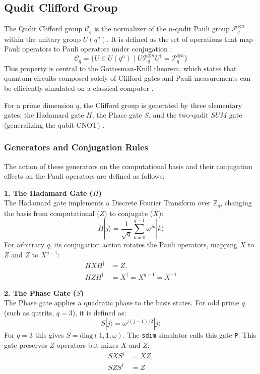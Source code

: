\subsection{Qudit Clifford Group}

The Qudit Clifford group $\mathcal{C}_q$ is the normalizer of the $n$-qudit Pauli group $\mathcal{P}_q^{\otimes n}$ within the unitary group $U(q^n)$. It is defined as the set of operations that map Pauli operators to Pauli operators under conjugation \cite{Gottesman1999}:
\begin{equation}
    \mathcal{C}_q = \{ U \in U(q^n) \mid U \mathcal{P}_q^{\otimes n} U^\dagger = \mathcal{P}_q^{\otimes n} \}
\end{equation}
This property is central to the Gottesman-Knill theorem, which states that quantum circuits composed solely of Clifford gates and Pauli measurements can be efficiently simulated on a classical computer \cite{Gottesman1998}.

For a prime dimension $q$, the Clifford group is generated by three elementary gates: the Hadamard gate $H$, the Phase gate $S$, and the two-qudit $SUM$ gate (generalizing the qubit CNOT) \cite{Hostens2005}.

\subsubsection{Generators and Conjugation Rules}
The action of these generators on the computational basis and their conjugation effects on the Pauli operators are defined as follows:

\textbf{1. The Hadamard Gate ($H$)} \\
The Hadamard gate implements a Discrete Fourier Transform over $\mathbb{Z}_q$, changing the basis from computational ($Z$) to conjugate ($X$):
\begin{equation}
    H |j\rangle = \frac{1}{\sqrt{q}} \sum_{k=0}^{q-1} \omega^{jk} |k\rangle
\end{equation}
For arbitrary $q$, its conjugation action rotates the Pauli operators, mapping $X$ to $Z$ and $Z$ to $X^{q-1}$:
\begin{align}
    H X H^\dagger &= Z, \\
    H Z H^\dagger &= X^\dagger = X^{q-1} = X^{-1}
\end{align}

\textbf{2. The Phase Gate ($S$)} \\
The Phase gate applies a quadratic phase to the basis states. For odd prime $q$ (such as qutrits, $q=3$), it is defined as:
\begin{equation}
    S |j\rangle = \omega^{j(j-1)/2} |j\rangle
\end{equation}
For $q=3$ this gives $S=\mathrm{diag}(1,1,\omega)$. The \texttt{sdim} simulator calls this gate \texttt{P}.
This gate preserves $Z$ operators but mixes $X$ and $Z$:
\begin{align}
    S X S^\dagger &= X Z, \\
    S Z S^\dagger &= Z
\end{align}

